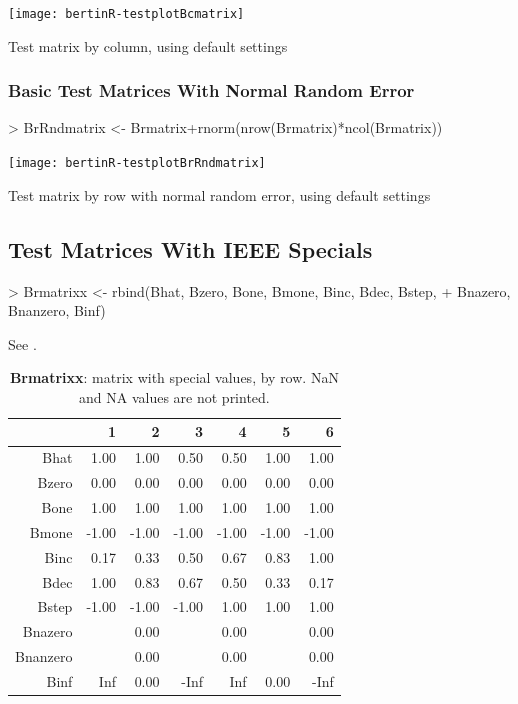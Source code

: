 \documentclass[nogin, dvips,12pt,a4paper,twoside]{amsart}
\begin{document}
\texttt{[image: bertinR-testplotBcmatrix]}


Test matrix by column,  using default settings

\clearpage

\subsubsection{Basic Test Matrices With Normal Random Error}

\begin{Schunk}
\begin{Sinput}
> BrRndmatrix <- Brmatrix+rnorm(nrow(Brmatrix)*ncol(Brmatrix))
\end{Sinput}
\end{Schunk}

\texttt{[image: bertinR-testplotBrRndmatrix]}

Test matrix by row with normal random error, using default settings

\clearpage
\subsection{Test Matrices With IEEE Specials}

\begin{Schunk}
\begin{Sinput}
> Brmatrixx <- rbind(Bhat, Bzero, Bone, Bmone, Binc, Bdec, Bstep,  
+ 	Bnazero, Bnanzero, Binf)
\end{Sinput}
\end{Schunk}

See .

\begin{center}
\begin{table}[ht]
\centering
\begin{tabular}{|r|rrrrrr|}
  \hline
 & 1 & 2 & 3 & 4 & 5 & 6 \\ 
  \hline
Bhat & 1.00 & 1.00 & 0.50 & 0.50 & 1.00 & 1.00 \\ 
  Bzero & 0.00 & 0.00 & 0.00 & 0.00 & 0.00 & 0.00 \\ 
  Bone & 1.00 & 1.00 & 1.00 & 1.00 & 1.00 & 1.00 \\ 
  Bmone & -1.00 & -1.00 & -1.00 & -1.00 & -1.00 & -1.00 \\ 
  Binc & 0.17 & 0.33 & 0.50 & 0.67 & 0.83 & 1.00 \\ 
  Bdec & 1.00 & 0.83 & 0.67 & 0.50 & 0.33 & 0.17 \\ 
  Bstep & -1.00 & -1.00 & -1.00 & 1.00 & 1.00 & 1.00 \\ 
  Bnazero &  & 0.00 &  & 0.00 &  & 0.00 \\ 
  Bnanzero &  & 0.00 &  & 0.00 &  & 0.00 \\ 
  Binf & Inf & 0.00 & -Inf & Inf & 0.00 & -Inf \\ 
   \hline
\end{tabular}
\caption{\textbf{Brmatrixx}: matrix with special values, by row. NaN and NA values are not printed.} 
\label{tab:Brmatrixx}
\end{table}\end{center}
\end{document}
